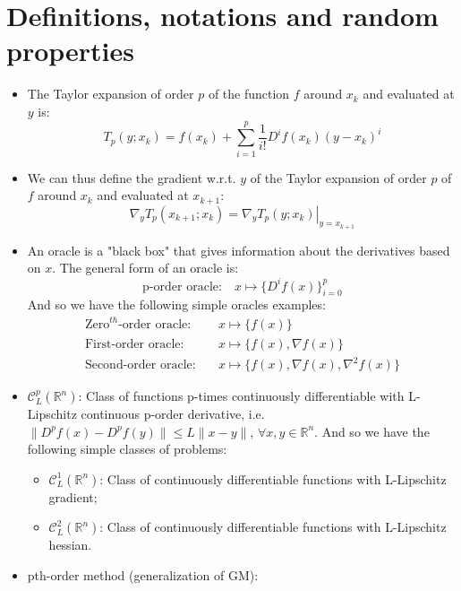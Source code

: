 \documentclass[12pt, openany]{report}
\newcommand{\R}{\mathbb{R}}
\newcommand{\C}{\mathcal{C}}
\theoremstyle{definition}
\begin{document}
\chapter{Definitions, notations and random properties}
\begin{itemize}
	\item The Taylor expansion of order $p$ of the function $f$ around $x_k$ and evaluated at $y$ is: 
	\begin{equation}
		T_p(y;x_k) = f(x_k) + \sum_{i=1}^{p} \frac{1}{i!} D^i f(x_k) (y-x_k)^i
	\end{equation}
	\item We can thus define the gradient w.r.t. $y$ of the Taylor expansion of order $p$ of $f$ around $x_k$ and evaluated at $x_{k+1}$:
	\begin{equation}
		\nabla_y T_p(x_{k+1};x_k) = \left. \nabla_y T_p(y;x_k) \right|_{y=x_{k+1}}
	\end{equation}
	\item An oracle is a "black box" that gives information about the derivatives based on $x$. The general form of an oracle is:
	\begin{equation}
		\text{p-order oracle:} \quad x \mapsto \{D^if(x)\}_{i=0}^p
	\end{equation}
	And so we have the following simple oracles examples:
	\begin{equation}
		\begin{aligned}
			\text{Zero}^{th} \text{-order oracle:} \quad &x \mapsto \{f(x)\} \\
			\text{First-order oracle:} \quad &x \mapsto \{ f(x), \nabla f(x) \} \\
			\text{Second-order oracle:} \quad &x \mapsto \{ f(x), \nabla f(x), \nabla^2 f(x) \}
		\end{aligned}
	\end{equation}
    \item $\C^p_L(\R^n)$: Class of functions p-times continuously differentiable with L-Lipschitz continuous p-order derivative, i.e. $\| D^pf(x) - D^pf(y) \| \leq L \|x-y \|$, $\forall x,y\in \R^n$. And so we have the following simple classes of problems:
    \begin{itemize}
		\item $\C^1_L(\R^n)$: Class of continuously differentiable functions with L-Lipschitz gradient;
    \item $\C^2_L(\R^n)$: Class of continuously differentiable functions with L-Lipschitz hessian.
	\end{itemize}
	\item  pth-order method (generalization of GM):

\end{itemize}
\end{document}
